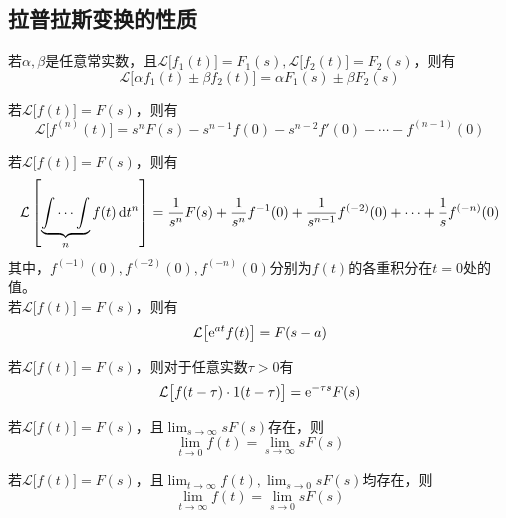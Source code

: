 \subsection{拉普拉斯变换的性质}

\ttheorem[线性性质]
若$\alpha,\beta$是任意常实数，且$\mathcal{L}\big[f_1(t)\big] = F_1(s), \mathcal{L}\big[f_2(t)\big] = F_2(s)$，则有
\begin{equation}
	\mathcal{L}\big[\alpha f_1(t)\pm \beta f_2(t)\big] = \alpha F_1(s) \pm \beta F_2(s)
\end{equation}

\theorem[微分性质]
若$\mathcal{L}\big[f(t)\big] = F(s)$，则有
\begin{equation}
	\mathcal{L}\big[f^{(n)}(t)\big] = s^nF(s) -s^{n-1}f(0)-s^{n-2}f'(0)- \cdots - f^{(n-1)}(0)
\end{equation}

\theorem[积分性质]
若$\mathcal{L}\big[f(t)\big] = F(s)$，则有
\begin{equation}
	\mathcal{L}\left[\underbrace{\int\cdots\int}_{n} f(t) \,{\rm{d}} t^n\right]=\frac{1}{s^n}F(s)+\frac{1}{s^n}f^{-1}(0) +\frac{1}{s^{n-1}}f^{(-2)}(0)+\cdots +\frac{1}{s}f^{(-n)}(0)
\end{equation}
其中，$f^{(-1)}(0),f^{(-2)}(0),f^{(-n)}(0)$分别为$f(t)$的各重积分在$t=0$处的值。\\

\theorem[位移性质]
若$\mathcal{L}\big[f(t)\big] = F(s)$，则有
\begin{equation}
	\mathcal{L}\big[{\rm{e}}^{at} f(t)\big] = F(s - a)
\end{equation}

\theorem[延迟性质]
若$\mathcal{L}\big[f(t)\big] = F(s)$，则对于任意实数$\tau > 0$有
\begin{equation}
	\mathcal{L}\big[f(t - \tau ) \cdot 1(t - \tau)\big] = {\rm{e}}^{-\tau s}F(s)
\end{equation}

\theorem[初值定理]
若$\mathcal{L}\big[f(t)\big] = F(s)$，且$\lim_{s \to \infty}s F(s)$存在，则
\begin{equation}
	\lim_{t \to 0}f(t) = \lim_{s \to \infty} s F(s)
\end{equation}

\theorem[终值定理]
若$\mathcal{L}\big[f(t)\big] = F(s)$，且$\lim_{t \to \infty}f(t), \lim_{s \to 0}s F(s)$均存在，则
\begin{equation}
	\lim_{t \to \infty}f(t) = \lim_{s \to 0} s F(s)
\end{equation}

